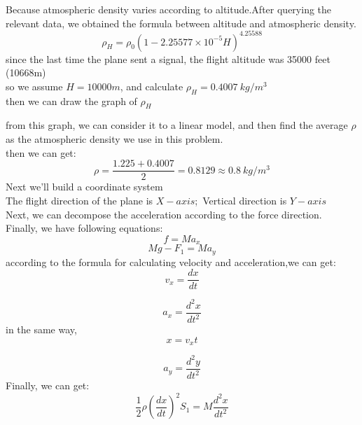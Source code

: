 \documentclass[11pt]{article}
\begin{document}
Because atmospheric density varies according to altitude.After querying the relevant data, we obtained the formula between altitude and atmospheric density.\\

\[\rho_H=\rho_0(1-2.25577\times 10^{-5}H)^{4.25588}\] 
since the last time the plane sent a signal, the flight altitude was 35000 feet (10668m)\\
so we assume $H=10000m$, and calculate $\rho_H=0.4007 \ kg/m^3$\\
then we can draw the graph of $\rho_H$\\
\begin{center}
    \end{center}
from this graph, we can consider it to a linear model, and then find the average $\rho $as the atmospheric density we use in this problem.\\
then we can get:\\

\[\rho=\frac{1.225+0.4007}{2}=0.8129 \approx 0.8\ kg/m^3\]
Next we'll build a coordinate system\\
The flight direction of the plane is $X-axis$;\  Vertical direction is $Y-axis$\\
Next, we can decompose the acceleration according to the force direction.\\
Finally, we have following equations:\\
\[f=Ma_x\]
\[Mg-F_1=Ma_y\] 
according to the formula for calculating velocity and acceleration,we can get:\\

\[v_x=\frac{dx}{dt}\]


\[a_x=\frac{d^2x}{dt^2}\]
in the same way, \\

\[x=v_xt\]

\[a_y=\frac{d^2y}{dt^2}\]
Finally, we can get:\\

\[\frac{1}{2}\rho( \frac{dx}{dt})^2 S_1=M\frac{d^2x}{dt^2}\] 
\end{document}
